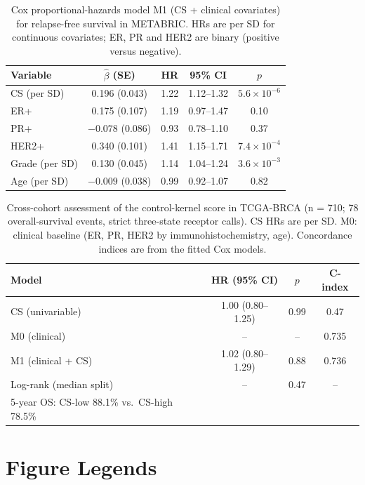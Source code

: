 \documentclass[12pt]{article}
\begin{document}
\begin{table}[h]
\centering
\caption{Cox proportional-hazards model M1 (CS + clinical covariates) for
relapse-free survival in METABRIC. HRs are per SD for continuous covariates;
ER, PR and HER2 are binary (positive versus negative).}
\label{tab:cox}
\begin{tabular}{lcccc}
\toprule
Variable & $\hat\beta$ (SE) & HR & 95\% CI & $p$ \\
\midrule
CS (per SD) & 0.196 (0.043) & 1.22 & 1.12--1.32 & $5.6\times10^{-6}$ \\
ER+ & 0.175 (0.107) & 1.19 & 0.97--1.47 & 0.10 \\
PR+ & $-0.078$ (0.086) & 0.93 & 0.78--1.10 & 0.37 \\
HER2+ & 0.340 (0.101) & 1.41 & 1.15--1.71 & $7.4\times10^{-4}$ \\
Grade (per SD) & 0.130 (0.045) & 1.14 & 1.04--1.24 & $3.6\times10^{-3}$ \\
Age (per SD) & $-0.009$ (0.038) & 0.99 & 0.92--1.07 & 0.82 \\
\bottomrule
\end{tabular}
\end{table}

\begin{table}[h]
\centering
\caption{Cross-cohort assessment of the control-kernel score in TCGA-BRCA
(n = 710; 78 overall-survival events, strict three-state receptor calls).
CS HRs are per SD. M0: clinical baseline (ER, PR, HER2 by
immunohistochemistry, age). Concordance indices are from the fitted Cox
models.}
\label{tab:tcga}
\begin{tabular}{lccc}
\toprule
Model & HR (95\% CI) & $p$ & C-index \\
\midrule
CS (univariable) & 1.00 (0.80--1.25) & 0.99 & 0.47 \\
M0 (clinical) & -- & -- & 0.735 \\
M1 (clinical + CS) & 1.02 (0.80--1.29) & 0.88 & 0.736 \\
Log-rank (median split) & -- & 0.47 & -- \\
5-year OS: CS-low 88.1\% vs.\ CS-high 78.5\% & & & \\
\bottomrule
\end{tabular}
\end{table}

\section*{Figure Legends}
\end{document}
